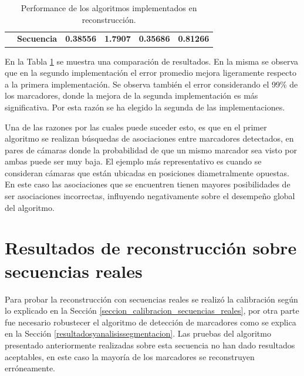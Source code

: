 \begin{table}[ht!]
{\begin{tabular}{cc|c|c|c|c|}
\multicolumn{1}{l|}{}                                                         & \textbf{Secuencia }                                            & \textbf{0.38556 }                                                         & \textbf{1.7907    }                                                    & \textbf{0.35686}                                                         &\textbf{ 0.81266}                                                       \\ \cline{2-6} 
\end{tabular}
}
\caption{Performance de los algoritmos implementados en reconstrucción. }
\label{table_performance_reconstruccion}
\end{table}

En la Tabla \ref{table_performance_reconstruccion} se muestra una comparación de resultados. En la misma se observa que en la segundo  implementación el error promedio mejora ligeramente respecto a la primera implementación. Se observa también el error considerando el 99\% de los marcadores, donde la mejora de la segunda implementación es más significativa. Por esta razón se ha elegido la segunda de las implementaciones.


Una de las razones por las cuales puede suceder esto, es que en el primer algoritmo se realizan búsquedas de asociaciones entre marcadores detectados, en pares de cámaras donde la probabilidad de que un mismo marcador sea visto por ambas puede ser muy baja. El ejemplo más representativo es cuando se consideran cámaras que están  ubicadas en posiciones diametralmente opuestas. En este caso las asociaciones que se encuentren tienen mayores posibilidades de ser asociaciones incorrectas, influyendo negativamente sobre el desempeño global del algoritmo. 



\section{Resultados de reconstrucción sobre secuencias reales}

Para probar la reconstrucción con secuencias reales se realizó la calibración según lo explicado en la Sección \ref{seccion_calibracion_secuencias_reales}, por otra parte fue necesario robustecer el algoritmo de detección de marcadores como se explica en la Sección \ref{resultadosyanalisissegmentacion}. Las pruebas del algoritmo presentado anteriormente realizadas sobre esta secuencia no han dado resultados aceptables, en este caso la mayoría de los marcadores se reconstruyen erróneamente. 


